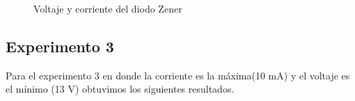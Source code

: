 \documentclass{mylib/reporteConCalif}
\begin{document}
\begin{figure}[H]%
    \centering
    \qquad
    \caption{Voltaje y corriente del diodo Zener}%
    \label{fig:example}%
\end{figure}

\subsection{Experimento 3}

Para el experimento 3 en donde la corriente es la máxima(10 mA) y el voltaje es el mínimo (13 V) obtuvimos los siguientes resultados.
\end{document}
